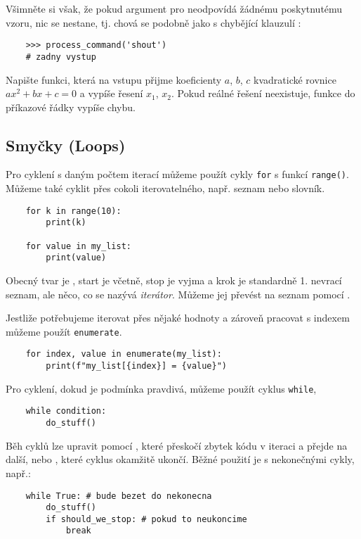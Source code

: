 Všimněte si však, že pokud argument pro  neodpovídá žádnému poskytnutému vzoru, nic se nestane, tj. chová se podobně jako  s chybějící klauzulí :
\begin{lstlisting}
    >>> process_command('shout')
    # zadny vystup
\end{lstlisting}

\begin{exercise}
Napište funkci, která na vstupu přijme koeficienty $a$, $b$, $c$ kvadratické rovnice $ax^2 + bx + c = 0$ a vypíše řesení $x_1$, $x_2$. 
Pokud reálné řešení neexistuje, funkce do příkazové řádky vypíše chybu.
\end{exercise}

\subsection{Smyčky (Loops)}
Pro cyklení s daným počtem iterací můžeme použít cykly \verb|for| s funkcí \verb|range()|. Můžeme také cyklit přes cokoli iterovatelného, např. seznam nebo slovník.
\begin{lstlisting}
    for k in range(10):
        print(k)

    for value in my_list:
        print(value) 
\end{lstlisting}
Obecný tvar  je , start je včetně, stop je vyjma a krok je standardně 1.  nevrací seznam, ale něco, co se nazývá \emph{iterátor}. Můžeme jej převést na seznam pomocí .

Jestliže potřebujeme iterovat přes nějaké hodnoty a zároveň pracovat s indexem můžeme použít \lstinline{enumerate}.
\begin{lstlisting}
    for index, value in enumerate(my_list):
        print(f"my_list[{index}] = {value}")
\end{lstlisting}

Pro cyklení, dokud je podmínka pravdivá, můžeme použít cyklus \verb|while|,
\begin{lstlisting}
    while condition:
        do_stuff()
\end{lstlisting}

Běh cyklů lze upravit pomocí , které přeskočí zbytek kódu v iteraci a přejde na další, nebo , které cyklus okamžitě ukončí. Běžné použití je s nekonečnými cykly, např.:
\begin{lstlisting}
    while True: # bude bezet do nekonecna
        do_stuff()
        if should_we_stop: # pokud to neukoncime
            break
\end{lstlisting}

